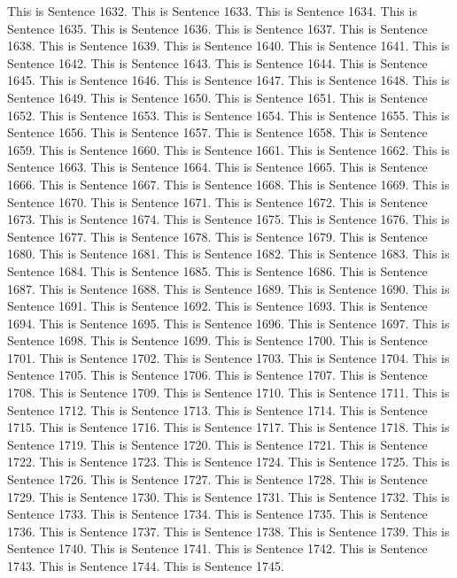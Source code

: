 \documentclass{article}
\begin{document}
This is Sentence 1632.
This is Sentence 1633.
This is Sentence 1634.
This is Sentence 1635.
This is Sentence 1636.
This is Sentence 1637.
This is Sentence 1638.
This is Sentence 1639.
This is Sentence 1640.
This is Sentence 1641.
This is Sentence 1642.
This is Sentence 1643.
This is Sentence 1644.
This is Sentence 1645.
This is Sentence 1646.
This is Sentence 1647.
This is Sentence 1648.
This is Sentence 1649.
This is Sentence 1650.
This is Sentence 1651.
This is Sentence 1652.
This is Sentence 1653.
This is Sentence 1654.
This is Sentence 1655.
This is Sentence 1656.
This is Sentence 1657.
This is Sentence 1658.
This is Sentence 1659.
This is Sentence 1660.
This is Sentence 1661.
This is Sentence 1662.
This is Sentence 1663.
This is Sentence 1664.
This is Sentence 1665.
This is Sentence 1666.
This is Sentence 1667.
This is Sentence 1668.
This is Sentence 1669.
This is Sentence 1670.
This is Sentence 1671.
This is Sentence 1672.
This is Sentence 1673.
This is Sentence 1674.
This is Sentence 1675.
This is Sentence 1676.
This is Sentence 1677.
This is Sentence 1678.
This is Sentence 1679.
This is Sentence 1680.
This is Sentence 1681.
This is Sentence 1682.
This is Sentence 1683.
This is Sentence 1684.
This is Sentence 1685.
This is Sentence 1686.
This is Sentence 1687.
This is Sentence 1688.
This is Sentence 1689.
This is Sentence 1690.
This is Sentence 1691.
This is Sentence 1692.
This is Sentence 1693.
This is Sentence 1694.
This is Sentence 1695.
This is Sentence 1696.
This is Sentence 1697.
This is Sentence 1698.
This is Sentence 1699.
This is Sentence 1700.
This is Sentence 1701.
This is Sentence 1702.
This is Sentence 1703.
This is Sentence 1704.
This is Sentence 1705.
This is Sentence 1706.
This is Sentence 1707.
This is Sentence 1708.
This is Sentence 1709.
This is Sentence 1710.
This is Sentence 1711.
This is Sentence 1712.
This is Sentence 1713.
This is Sentence 1714.
This is Sentence 1715.
This is Sentence 1716.
This is Sentence 1717.
This is Sentence 1718.
This is Sentence 1719.
This is Sentence 1720.
This is Sentence 1721.
This is Sentence 1722.
This is Sentence 1723.
This is Sentence 1724.
This is Sentence 1725.
This is Sentence 1726.
This is Sentence 1727.
This is Sentence 1728.
This is Sentence 1729.
This is Sentence 1730.
This is Sentence 1731.
This is Sentence 1732.
This is Sentence 1733.
This is Sentence 1734.
This is Sentence 1735.
This is Sentence 1736.
This is Sentence 1737.
This is Sentence 1738.
This is Sentence 1739.
This is Sentence 1740.
This is Sentence 1741.
This is Sentence 1742.
This is Sentence 1743.
This is Sentence 1744.
This is Sentence 1745.
\end{document}
